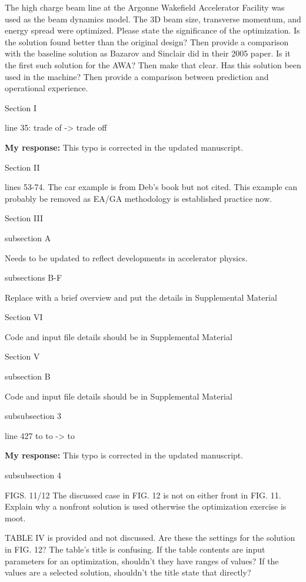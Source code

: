 \documentclass{article}
\begin{document}
The high charge beam line at the Argonne Wakefield Accelerator
Facility was used as the beam dynamics model. The 3D beam size,
transverse momentum, and energy spread were optimized. Please state
the significance of the optimization. Is the solution found better
than the original design? Then provide a comparison with the baseline
solution as Bazarov and Sinclair did in their 2005 paper. Is it the
first such solution for the AWA? Then make that clear. Has this
solution been used in the machine? Then provide a comparison between
prediction and operational experience.

Section I

line 35: trade of -> trade off

{\bf My response:} {\color{blue} This typo is corrected in the updated manuscript.}

Section II

lines 53-74. The car example is from Deb’s book but not cited. This
example can probably be removed as EA/GA methodology is established
practice now.

Section III

subsection A

Needs to be updated to reflect developments in accelerator physics.

subsections B-F

Replace with a brief overview and put the details in Supplemental
Material

Section VI

Code and input file details should be in Supplemental Material

Section V

subsection B

Code and input file details should be in Supplemental Material

subsubsection 3

line 427 to to -> to

{\bf My response:} {\color{blue} This typo is corrected in the updated manuscript.}

subsubsection 4

FIGS. 11/12 The discussed case in FIG. 12 is not on either front in
FIG. 11. Explain why a nonfront solution is used otherwise the
optimization exercise is moot.

TABLE IV is provided and not discussed. Are these the settings for the
solution in FIG. 12? The table’s title is confusing. If the table
contents are input parameters for an optimization, shouldn’t they have
ranges of values? If the values are a selected solution, shouldn’t the
title state that directly?
\end{document}
